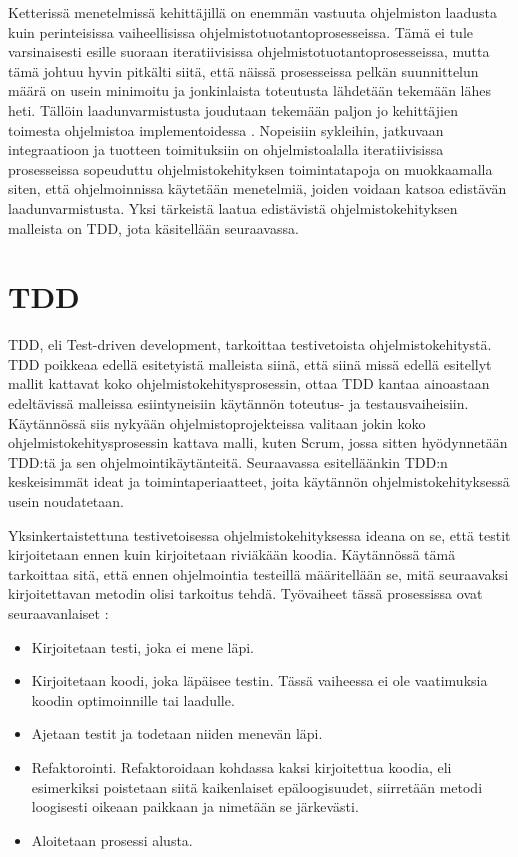 \documentclass[finnish,nonumbib,nocopyright]{gradu2}
\begin{document}
Ketterissä menetelmissä kehittäjillä on enemmän vastuuta ohjelmiston laadusta kuin perinteisissa vaiheellisissa ohjelmistotuotantoprosesseissa. Tämä ei tule varsinaisesti esille suoraan iteratiivisissa ohjelmistotuotantoprosesseissa, mutta tämä johtuu hyvin pitkälti siitä, että näissä prosesseissa pelkän suunnittelun määrä on usein minimoitu ja jonkinlaista toteutusta lähdetään tekemään lähes heti. Tällöin laadunvarmistusta joudutaan tekemään paljon jo kehittäjien toimesta ohjelmistoa implementoidessa \cite{agilequality}. Nopeisiin sykleihin, jatkuvaan integraatioon ja tuotteen toimituksiin on ohjelmistoalalla iteratiivisissa prosesseissa sopeuduttu ohjelmistokehityksen toimintatapoja on muokkaamalla siten, että ohjelmoinnissa käytetään menetelmiä, joiden voidaan katsoa edistävän laadunvarmistusta. Yksi tärkeistä laatua edistävistä ohjelmistokehityksen malleista on TDD, jota käsitellään seuraavassa.

\section{TDD}

TDD, eli Test-driven development, tarkoittaa testivetoista ohjelmistokehitystä. TDD poikkeaa edellä esitetyistä malleista siinä, että siinä missä edellä esitellyt mallit kattavat koko ohjelmistokehitysprosessin, ottaa TDD kantaa ainoastaan edeltävissä malleissa esiintyneisiin käytännön toteutus- ja testausvaiheisiin. Käytännössä siis nykyään ohjelmistoprojekteissa valitaan jokin koko ohjelmistokehitysprosessin kattava malli, kuten Scrum, jossa sitten hyödynnetään TDD:tä ja sen ohjelmointikäytänteitä. Seuraavassa esitelläänkin TDD:n keskeisimmät ideat ja toimintaperiaatteet, joita käytännön ohjelmistokehityksessä usein noudatetaan.

Yksinkertaistettuna testivetoisessa ohjelmistokehityksessa ideana on se, että testit kirjoitetaan ennen kuin kirjoitetaan riviäkään koodia. Käytännössä tämä tarkoittaa sitä, että ennen ohjelmointia testeillä määritellään se, mitä seuraavaksi kirjoitettavan metodin olisi tarkoitus tehdä. Työvaiheet tässä prosessissa ovat seuraavanlaiset \cite{tdd}:
\begin{itemize}
\item Kirjoitetaan testi, joka ei mene läpi.
\item Kirjoitetaan koodi, joka läpäisee testin. Tässä vaiheessa ei ole vaatimuksia koodin optimoinnille tai laadulle.
\item Ajetaan testit ja todetaan niiden menevän läpi.
\item Refaktorointi. Refaktoroidaan kohdassa kaksi kirjoitettua koodia, eli esimerkiksi poistetaan siitä kaikenlaiset epäloogisuudet, siirretään metodi loogisesti oikeaan paikkaan ja nimetään se järkevästi.
\item Aloitetaan prosessi alusta.
\end{itemize}
\end{document}
